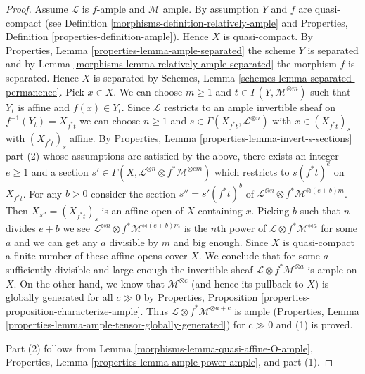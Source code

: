 \begin{proof}

Assume $\mathcal{L}$ is $f$-ample and $\mathcal{M}$ ample.
By assumption $Y$ and $f$ are quasi-compact (see
Definition \ref{morphisms-definition-relatively-ample} and
Properties, Definition \ref{properties-definition-ample}).
Hence $X$ is quasi-compact. By Properties, Lemma
\ref{properties-lemma-ample-separated} the scheme $Y$ is
separated and by Lemma \ref{morphisms-lemma-relatively-ample-separated}
the morphism $f$ is separated. Hence $X$ is separated by
Schemes, Lemma \ref{schemes-lemma-separated-permanence}.
Pick $x \in X$. We can choose $m \geq 1$
and $t \in \Gamma(Y, \mathcal{M}^{\otimes m})$ such that $Y_t$
is affine and $f(x) \in Y_t$. Since $\mathcal{L}$ restricts to an
ample invertible sheaf on $f^{-1}(Y_t) = X_{f^*t}$
we can choose $n \geq 1$ and $s \in \Gamma(X_{f^*t}, \mathcal{L}^{\otimes n})$
with $x \in (X_{f^*t})_s$ with $(X_{f^*t})_s$ affine.
By Properties, Lemma \ref{properties-lemma-invert-s-sections} part (2)
whose assumptions are satisfied by the above,
there exists an integer $e \geq 1$ and a section
$s' \in \Gamma(X, \mathcal{L}^{\otimes n} \otimes f^*\mathcal{M}^{\otimes em})$
which restricts to $s(f^*t)^e$ on $X_{f^*t}$. For any $b > 0$
consider the section $s'' = s'(f^*t)^b$ of
$\mathcal{L}^{\otimes n} \otimes f^*\mathcal{M}^{\otimes (e + b)m}$.
Then $X_{s''} = (X_{f^*t})_s$ is an affine open of $X$ containing $x$.
Picking $b$ such that $n$ divides $e + b$ we see
$\mathcal{L}^{\otimes n} \otimes f^*\mathcal{M}^{\otimes (e + b)m}$
is the $n$th power of $\mathcal{L} \otimes f^*\mathcal{M}^{\otimes a}$
for some $a$ and we can get any $a$ divisible by $m$ and big enough.
Since $X$ is quasi-compact a finite number of these affine opens
cover $X$. We conclude that for some $a$ sufficiently divisible and
large enough the invertible sheaf
$\mathcal{L} \otimes f^*\mathcal{M}^{\otimes a}$ is ample on $X$.
On the other hand, we know that $\mathcal{M}^{\otimes c}$
(and hence its pullback to $X$) is globally generated for all $c \gg 0$
by Properties, Proposition \ref{properties-proposition-characterize-ample}.
Thus $\mathcal{L} \otimes f^*\mathcal{M}^{\otimes a + c}$ is ample
(Properties, Lemma \ref{properties-lemma-ample-tensor-globally-generated})
for $c \gg 0$ and (1) is proved.

\medskip\noindent
Part (2) follows from Lemma \ref{morphisms-lemma-quasi-affine-O-ample},
Properties, Lemma \ref{properties-lemma-ample-power-ample}, and
part (1).
\end{proof}

